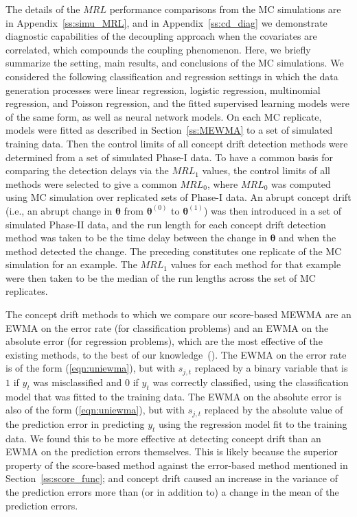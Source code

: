 \documentclass[twoside,11pt]{article}
\begin{document}
The details of the $MRL$ performance comparisons from the MC simulations are in Appendix~\ref{ss:simu_MRL}, and in Appendix~\ref{ss:cd_diag} we demonstrate diagnostic capabilities of the decoupling approach when the covariates are correlated, which compounds the coupling phenomenon. Here, we briefly summarize the setting, main results, and conclusions of the MC simulations. We considered the following classification and regression settings in which the data generation processes were linear regression, logistic regression, multinomial regression, and Poisson regression, and the fitted supervised learning models were of the same form, as well as neural network models. On each MC replicate, models were fitted as described in Section~\ref{ss:MEWMA} to a set of simulated training data. Then the control limits of all concept drift detection methods were determined from a set of simulated Phase-I data. To have a common basis for comparing the detection delays via the $MRL_1$ values, the control limits of all methods were selected to give a common $MRL_0$, where $MRL_0$ was computed using MC simulation over replicated sets of Phase-I data. An abrupt concept drift (i.e., an abrupt change in $\bm{\theta}$ from $\bm{\theta}^{(0)}$ to $\bm{\theta}^{(1)}$) was then introduced in a set of simulated Phase-II data, and the run length for each concept drift detection method was taken to be the time delay between the change in $\bm{\theta}$ and when the method detected the change. The preceding constitutes one replicate of the MC simulation for an example. The $MRL_1$ values for each method for that example were then taken to be the median of the run lengths across the set of MC replicates.

The concept drift methods to which we compare our score-based MEWMA are an EWMA on the error rate (for classification problems) and an EWMA on the absolute error (for regression problems), which are the most effective of the existing methods, to the best of our knowledge~(\cite{ross2012exponentially,barros2018large,lu2018learning}). The EWMA on the error rate is of the form (\ref{eqn:uniewma}), but with $s_{j,t}$ replaced by a binary variable that is $1$ if $y_t$ was misclassified and $0$ if $y_t$ was correctly classified, using the classification model that was fitted to the training data. The EWMA on the absolute error is also of the form (\ref{eqn:uniewma}), but with $s_{j,t}$ replaced by the absolute value of the prediction error in predicting $y_t$ using the regression model fit to the training data. We found this to be more effective at detecting concept drift than an EWMA on the prediction errors themselves. This is likely because the superior property of the score-based method against the error-based method mentioned in Section~\ref{ss:score_func}; and concept drift caused an increase in the variance of the prediction errors more than (or in addition to) a change in the mean of the prediction errors. %
\end{document}
